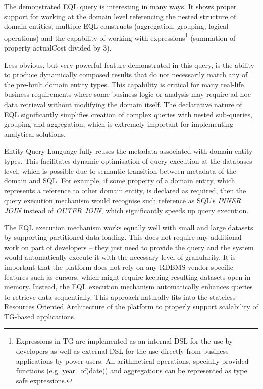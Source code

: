   The demonstrated EQL query is interesting in many ways.
  It shows proper support for working at the domain level referencing the nested structure of domain entities, multiple EQL constructs (aggregation, grouping, logical operations) and the capability of working with expressions\footnote{
    Expressions in TG are implemented as an internal DSL for the use by developers as well as external DSL for the use directly from business applications by power users. 
    All arithmetical operations, specially provided functions (e.g. year\_of(date)) and aggregations can be represented as type safe expressions.
  }
  (summation of property actualCost divided by 3).  
  
  Less obvious, but very powerful feature demonstrated in this query, is the ability to produce dynamically composed results that do not necessarily match any of the pre-built domain entity types.
  This capability is critical for many real-life business requirements where some business logic or analysis may require ad-hoc data retrieval without modifying the domain itself.
  The declarative nature of EQL significantly simplifies creation of complex queries with nested sub-queries, grouping and aggregation, which is extremely important for implementing analytical solutions.  

  Entity Query Language fully reuses the metadata associated with domain entity types.
  This facilitates dynamic optimisation of query execution at the databases level, which is possible due to semantic transition between metadata of the domain and SQL.
  For example, if some property of a domain entity, which represents a reference to other domain entity, is declared as required, then the query execution mechanism would recognise such reference as SQL's \emph{INNER JOIN} instead of \emph{OUTER JOIN}, which significantly speeds up query execution.

  The EQL execution mechanism works equally well with small and large datasets by supporting partitioned data loading.
  This does not require any additional work on part of developers -- they just need to provide the query and the system would automatically execute it with the necessary level of granularity.
  It is important that the platform does not rely on any RDBMS vendor specific features such as cursors, which might require keeping resulting datasets open in memory.
  Instead, the EQL execution mechanism automatically enhances queries to retrieve data sequentially.
  This approach naturally fits into the stateless Resources Oriented Architecture of the platform to properly support scalability of TG-based applications.

